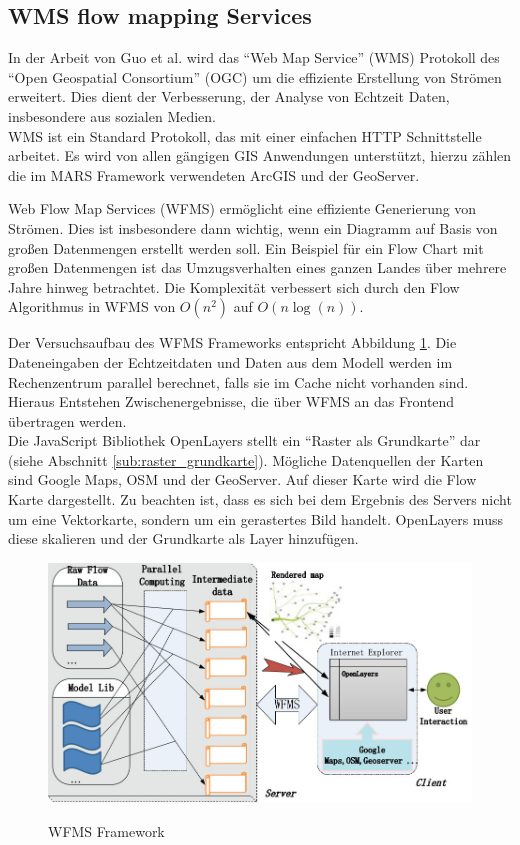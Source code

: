 \documentclass[10pt,conference,compsocconf]{IEEEtran}
\begin{document}
\subsection{WMS flow mapping Services}
\label{sub:flow_mapping}
In der Arbeit  von Guo et al.\cite{wms_flow_mapping} wird das \enquote{Web Map Service} (WMS) Protokoll des \enquote{Open Geospatial Consortium} (OGC) um die effiziente Erstellung von Strömen erweitert. Dies dient der Verbesserung, der Analyse von Echtzeit Daten, insbesondere aus sozialen Medien.\\
WMS ist ein Standard Protokoll, das mit einer einfachen HTTP Schnittstelle arbeitet. Es wird von allen gängigen GIS Anwendungen unterstützt, hierzu zählen die im MARS Framework verwendeten ArcGIS und der GeoServer.\par

Web Flow Map Services (WFMS) ermöglicht eine effiziente Generierung von Strömen. Dies ist insbesondere dann wichtig, wenn ein Diagramm auf Basis von großen Datenmengen erstellt werden soll. Ein Beispiel für ein Flow Chart mit großen Datenmengen ist das Umzugsverhalten eines ganzen Landes über mehrere Jahre hinweg betrachtet. Die Komplexität verbessert sich durch den Flow Algorithmus in WFMS von $O(n^2 )$ auf $O(n \log (n))$.\par

Der Versuchsaufbau des WFMS Frameworks entspricht Abbildung \ref{img:wfms}. Die Dateneingaben der Echtzeitdaten und Daten aus dem Modell werden im Rechenzentrum parallel berechnet, falls sie im Cache nicht vorhanden sind. Hieraus Entstehen Zwischenergebnisse, die über WFMS an das Frontend übertragen werden.\\
Die JavaScript Bibliothek OpenLayers stellt ein \enquote{Raster als Grundkarte} dar (siehe Abschnitt \ref{sub:raster_grundkarte}). Mögliche Datenquellen der Karten sind Google Maps, OSM und der GeoServer. Auf dieser Karte wird die Flow Karte dargestellt. Zu beachten ist, dass es sich bei dem Ergebnis des Servers nicht um eine Vektorkarte, sondern um ein gerastertes Bild handelt. OpenLayers muss diese skalieren und der Grundkarte als Layer hinzufügen.

\begin{figure}[H]
  \centering
  	\includegraphics[width=\columnwidth]{img/wfms}\\
  \caption[]{WFMS Framework\cite{wms_flow_mapping}}
  \label{img:wfms}
\end{figure}
\end{document}
